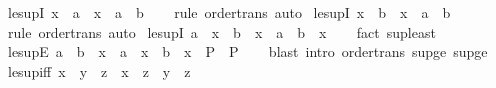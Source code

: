 \begin{isabellebody}
\isanewline
{}\isamarkupfalse%
\ le{\isacharunderscore}{\kern0pt}supI{}{\isacharcolon}{\kern0pt}\ {\isachardoublequoteopen}x\ {\isasymle}\ a\ {\isasymLongrightarrow}\ x\ {\isasymle}\ a\ {\isasymsqunion}\ b{\isachardoublequoteclose}\isanewline
%
\isadelimproof
\ \ %
\endisadelimproof
%
\isatagproof
{}\isamarkupfalse%
\ {\isacharparenleft}{\kern0pt}rule\ order{\isacharunderscore}{\kern0pt}trans{\isacharparenright}{\kern0pt}\ auto%
\endisatagproof
{\isafoldproof}%
%
\isadelimproof
\isanewline
%
\endisadelimproof
\isanewline
{}\isamarkupfalse%
\ le{\isacharunderscore}{\kern0pt}supI{}{\isacharcolon}{\kern0pt}\ {\isachardoublequoteopen}x\ {\isasymle}\ b\ {\isasymLongrightarrow}\ x\ {\isasymle}\ a\ {\isasymsqunion}\ b{\isachardoublequoteclose}\isanewline
%
\isadelimproof
\ \ %
\endisadelimproof
%
\isatagproof
{}\isamarkupfalse%
\ {\isacharparenleft}{\kern0pt}rule\ order{\isacharunderscore}{\kern0pt}trans{\isacharparenright}{\kern0pt}\ auto%
\endisatagproof
{\isafoldproof}%
%
\isadelimproof
\isanewline
%
\endisadelimproof
\isanewline
{}\isamarkupfalse%
\ le{\isacharunderscore}{\kern0pt}supI{\isacharcolon}{\kern0pt}\ {\isachardoublequoteopen}a\ {\isasymle}\ x\ {\isasymLongrightarrow}\ b\ {\isasymle}\ x\ {\isasymLongrightarrow}\ a\ {\isasymsqunion}\ b\ {\isasymle}\ x{\isachardoublequoteclose}\isanewline
%
\isadelimproof
\ \ %
\endisadelimproof
%
\isatagproof
{}\isamarkupfalse%
\ {\isacharparenleft}{\kern0pt}fact\ sup{\isacharunderscore}{\kern0pt}least{\isacharparenright}{\kern0pt}%
\endisatagproof
{\isafoldproof}%
%
\isadelimproof
%
\endisadelimproof
\ \isanewline
\isanewline
{}\isamarkupfalse%
\ le{\isacharunderscore}{\kern0pt}supE{\isacharcolon}{\kern0pt}\ {\isachardoublequoteopen}a\ {\isasymsqunion}\ b\ {\isasymle}\ x\ {\isasymLongrightarrow}\ {\isacharparenleft}{\kern0pt}a\ {\isasymle}\ x\ {\isasymLongrightarrow}\ b\ {\isasymle}\ x\ {\isasymLongrightarrow}\ P{\isacharparenright}{\kern0pt}\ {\isasymLongrightarrow}\ P{\isachardoublequoteclose}\isanewline
%
\isadelimproof
\ \ %
\endisadelimproof
%
\isatagproof
{}\isamarkupfalse%
\ {\isacharparenleft}{\kern0pt}blast\ intro{\isacharcolon}{\kern0pt}\ order{\isacharunderscore}{\kern0pt}trans\ sup{\isacharunderscore}{\kern0pt}ge{}\ sup{\isacharunderscore}{\kern0pt}ge{}{\isacharparenright}{\kern0pt}%
\endisatagproof
{\isafoldproof}%
%
\isadelimproof
\isanewline
%
\endisadelimproof
\isanewline
{}\isamarkupfalse%
\ le{\isacharunderscore}{\kern0pt}sup{\isacharunderscore}{\kern0pt}iff{\isacharcolon}{\kern0pt}\ {\isachardoublequoteopen}x\ {\isasymsqunion}\ y\ {\isasymle}\ z\ {\isasymlongleftrightarrow}\ x\ {\isasymle}\ z\ {\isasymand}\ y\ {\isasymle}\ z{\isachardoublequoteclose}\isanewline

\end{isabellebody}
